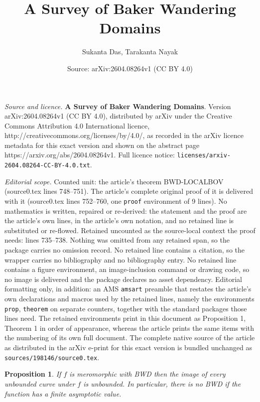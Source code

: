\documentclass[10pt,a4paper]{amsart}
\title{\textbf{A Survey of Baker Wandering Domains}}
\author{Sukanta Das, Tarakanta Nayak}
\date{Source: arXiv:2604.08264v1 (CC BY 4.0)}
\newtheorem{prop}{Proposition}
\begin{document}
\maketitle

\noindent\emph{Source and licence.} \textbf{A Survey of Baker Wandering Domains}. Version arXiv:2604.08264v1 (CC BY 4.0), distributed by arXiv under the Creative Commons Attribution 4.0 International licence, http://creativecommons.org/licenses/by/4.0/, as recorded in the arXiv licence metadata for this exact version and shown on the abstract page https://arxiv.org/abs/2604.08264v1. Full licence notice: \texttt{licenses/arxiv-2604.08264-CC-BY-4.0.txt}.\par\smallskip

\noindent\textit{Editorial scope.} Counted unit: the article's theorem BWD-LOCALBOV (source0.tex lines 748--751). The article's complete original proof of it is delivered with it (source0.tex lines 752--760, one \texttt{proof} environment of 9 lines). No mathematics is written, repaired or re-derived: the statement and the proof are the article's own lines, in the article's own notation, and no retained line is substituted or re-flowed.  Retained uncounted as the source-local context the proof needs: lines 735--738.  Nothing was omitted from any retained span, so the package carries no omission record.  No retained line contains a citation, so the wrapper carries no bibliography and no bibliography entry.  No retained line contains a figure environment, an image-inclusion command or drawing code, so no image is delivered and the package declares no asset dependency.  Editorial formatting only, in addition: an AMS \texttt{amsart} preamble that restates the article's own declarations and macros used by the retained lines, namely the environments \texttt{prop}, \texttt{theorem} on separate counters, together with the standard packages those lines need.  The retained environments print in this document as Proposition 1, Theorem 1 in order of appearance, whereas the article prints the same items with the numbering of its own full document.  The complete native source of the article as distributed in the arXiv e-print for this exact version is bundled unchanged as \texttt{sources/198146/source0.tex}.
	\begin{prop}
		If $f$ is meromorphic with BWD then the image of every unbounded curve under $f$ is unbounded.  In particular, there is no BWD if the function  has a finite asymptotic value.
		\label{unbounded-BWD}
	\end{prop}
\end{document}
